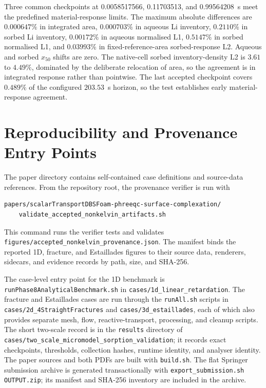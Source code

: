 Three common checkpoints at 0.0058517566, 0.11703513, and 0.99564208~s meet
the predefined material-response limits. The maximum absolute differences
are $0.000647\%$ in integrated area, $0.000703\%$ in aqueous Li inventory,
$0.2110\%$ in sorbed Li inventory, $0.00172\%$ in aqueous normalised L1,
$0.5147\%$ in sorbed normalised L1, and $0.03993\%$ in fixed-reference-area
sorbed-response L2. Aqueous and sorbed $x_{50}$ shifts are zero. The native-cell
sorbed inventory-density L2 is $3.61$ to $4.49\%$, dominated by the deliberate
relocation of area, so the agreement is in integrated response rather than
pointwise. The last accepted checkpoint covers $0.489\%$ of the configured
$203.53$~s horizon, so the test establishes early material-response agreement.

\section{Reproducibility and Provenance Entry Points}

The paper directory contains self-contained case definitions and source-data
references. From the repository root, the provenance verifier is run with
\begin{verbatim}
papers/scalarTransportDBSFoam-phreeqc-surface-complexation/
    validate_accepted_nonkelvin_artifacts.sh
\end{verbatim}
This command runs the verifier tests and validates
\texttt{figures/accepted\_nonkelvin\_provenance.json}. The manifest binds the
reported 1D, fracture, and Estaillades figures to their source data, renderers,
sidecars, and evidence records by path, size, and SHA-256.

The case-level entry point for the 1D benchmark is
\texttt{runPhase8AnalyticalBenchmark.sh} in
\nolinkurl{cases/1d_linear_retardation}. The fracture and Estaillades cases are
run through the \texttt{runAll.sh} scripts in
\nolinkurl{cases/2d_4StraightFractures} and \nolinkurl{cases/3d_estaillades},
each of which also provides separate mesh, flow, reactive-transport,
processing, and cleanup scripts. The short
two-scale record is in the \texttt{results} directory of
\nolinkurl{cases/two_scale_micromodel_sorption_validation}; it records exact
checkpoints, thresholds, collection hashes, runtime identity, and analyser
identity. The paper sources and both PDFs are built with \texttt{build.sh}. The
flat Springer submission archive is generated transactionally with
\texttt{export\_submission.sh OUTPUT.zip}; its manifest and SHA-256 inventory
are included in the archive.
